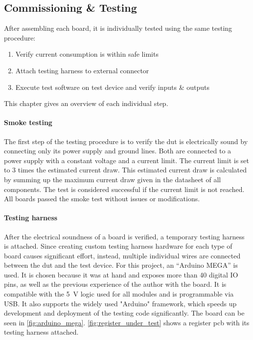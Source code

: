 \subsection{Commissioning \& Testing} \label{sec:hardware_testing}

After assembling each board, it is individually tested using the same testing procedure:

\begin{enumerate}
    \item Verify current consumption is within safe limits
    \item Attach testing harness to external connector
    \item Execute test software on test device and verify inputs \& outputs
\end{enumerate}

This chapter gives an overview of each individual step.

\paragraph*{Smoke testing}

The first step of the testing procedure is to verify the \ac{dut} is electrically sound by connecting only its power supply and ground lines. Both are connected to a power supply with a constant voltage and a current limit. The current limit is set to 3 times the estimated current draw. This estimated current draw is calculated by summing up the maximum current draw given in the datasheet of all components. The test is considered successful if the current limit is not reached. All boards passed the smoke test without issues or modifications.

\paragraph*{Testing harness}

After the electrical soundness of a board is verified, a temporary testing harness is attached. Since creating custom testing harness hardware for each type of board causes significant effort, instead, multiple individual wires are connected between the \ac{dut} and the test device. For this project, an ``Arduino MEGA'' is used. It is chosen because it was at hand and exposes more than 40 digital IO pins, as well as the previous experience of the author with the board. It is compatible with the \SI{5}{\volt} logic used for all modules and is programmable via USB. It also supports the widely used "Arduino" framework, which speeds up development and deployment of the testing code significantly. The board can be seen in \autoref{fig:arduino_mega}. \autoref{fig:register_under_test} shows a register \ac{pcb} with its testing harness attached.

